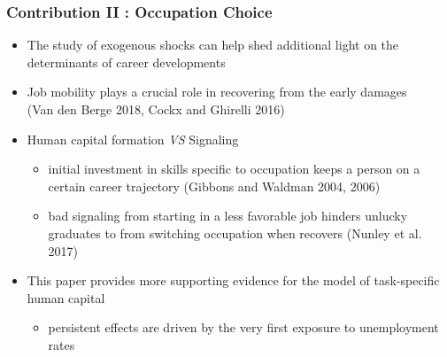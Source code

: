 \documentclass[10pt,svgnames,fragile]{beamer}
\begin{document}
{\begin{frame}
	\frametitle{Contribution II : Occupation Choice} 
	\begin{itemize}
		\item The study of exogenous shocks can help shed additional light on the determinants of career developments
\vfill
		\item Job mobility plays a crucial role in recovering from the early damages\\  (Van den Berge 2018, Cockx and Ghirelli 2016) 
\vfill
		\item Human capital formation \textit{VS} Signaling 
		\begin{itemize}
			\vspace{1.5 mm}
			\item initial investment in skills specific to occupation keeps a person on a certain career trajectory (Gibbons and Waldman 2004, 2006)
			\vspace{1 mm}
			\item bad signaling from starting in a less favorable job hinders unlucky graduates to from switching occupation when recovers (Nunley et al. 2017)
		\end{itemize}
\vfill
		\item This paper provides more supporting evidence for the model of task-specific human capital 
		\begin{itemize}
			\vspace{1.5 mm}
			\item  persistent effects are driven by the very first exposure to unemployment rates
		\end{itemize}		
\vfill
	\end{itemize}
\end{frame}
}
\end{document}
